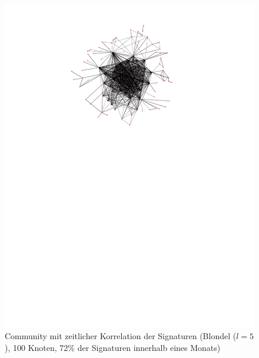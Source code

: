 \begin{figure}[th]
  \centering
  \includegraphics[scale=1.5]{images/subgraph-label-time-fa62cc57cd35e9f90b85435efc407ad5.pdf}
  \caption{Community mit zeitlicher Korrelation der Signaturen
    (Blondel ($l=5$),
    100 Knoten, 72\% der Signaturen innerhalb eines Monats)}
  \label{fig:time-corr-com-normal}
\end{figure}


